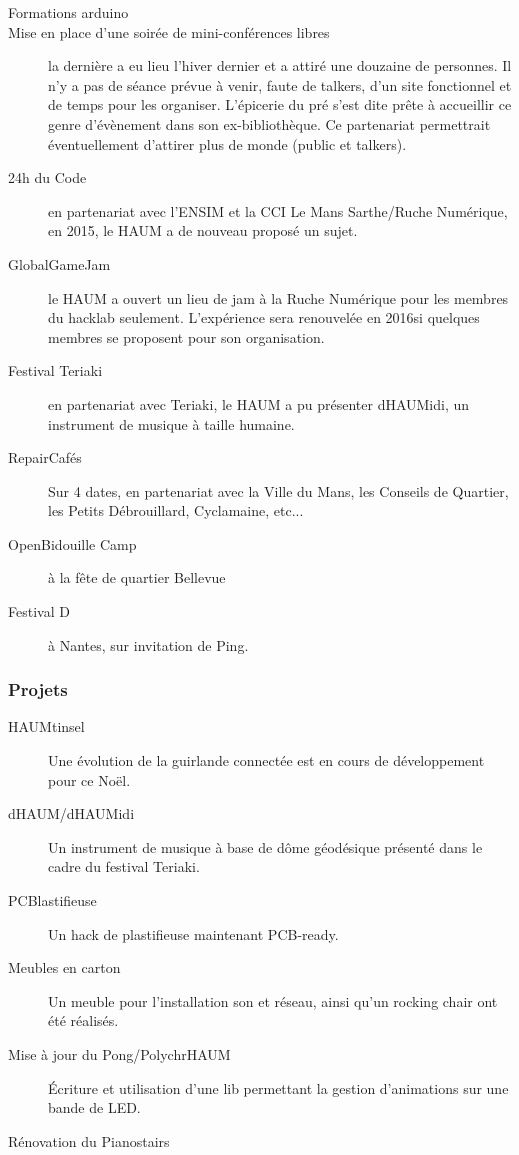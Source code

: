 \documentclass[a4paper, 11pt]{article}
\begin{document}
\begin{description}
    \item[Formations arduino]
    \item[Mise en place d'une soirée de mini-conférences libres] la dernière a eu lieu l'hiver dernier et a attiré une
		douzaine de personnes. Il n'y a pas de séance prévue à venir, faute de talkers, d'un site fonctionnel et de
		temps pour les organiser. L'épicerie du pré s'est dite prête à accueillir ce genre d'évènement dans son ex-bibliothèque. Ce partenariat permettrait éventuellement d'attirer plus de monde (public et talkers).
    \item[24h du Code] en partenariat avec l'ENSIM et la CCI Le Mans Sarthe/Ruche Numérique, en 2015, le HAUM a de nouveau proposé un sujet.
	\item[GlobalGameJam] le HAUM a ouvert un lieu de jam à la Ruche Numérique pour les membres du hacklab seulement. L'expérience sera renouvelée en 2016si quelques membres se proposent pour son organisation.
    \item[Festival Teriaki] en partenariat avec Teriaki, le HAUM a pu présenter dHAUMidi, un instrument de musique à taille humaine.
	\item[RepairCafés] Sur 4 dates, en partenariat avec la Ville du Mans, les Conseils de Quartier, les Petits
		Débrouillard, Cyclamaine, etc...
	\item[OpenBidouille Camp] à la fête de quartier Bellevue
	\item[Festival D] à Nantes, sur invitation de Ping.
\end{description}

\subsubsection{Projets}
\label{ssec:projects}

\begin{description}
	\item[HAUMtinsel] Une évolution de la guirlande connectée est en cours de développement pour ce Noël.
	\item[dHAUM/dHAUMidi] Un instrument de musique à base de dôme géodésique présenté dans le cadre du festival Teriaki.
	\item[PCBlastifieuse] Un hack de plastifieuse maintenant PCB-ready.
	\item[Meubles en carton] Un meuble pour l'installation son et réseau, ainsi qu'un rocking chair ont été réalisés.
	\item[Mise à jour du Pong/PolychrHAUM] Écriture et utilisation d'une lib permettant la gestion d'animations sur une bande de LED.
	\item[Rénovation du Pianostairs]
\end{description}
\end{document}
